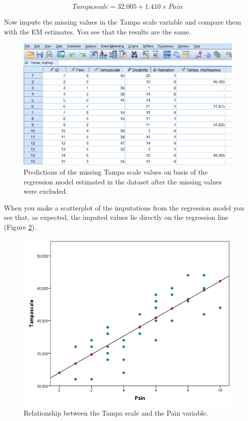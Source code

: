 \documentclass[]{book}
\theoremstyle{definition}
\theoremstyle{definition}
\theoremstyle{definition}
\theoremstyle{remark}
\begin{document}
\[Tampascale = 32.005 + 1.410 × Pain\]

Now impute the missing values in the Tampa scale variable and compare
them with the EM estimates. You see that the results are the same.

\begin{figure}

{\centering \includegraphics[width=0.7\linewidth]{images/fig3.15} 

}

\caption{Predictions of the missing Tampa scale values on basis of the regression model estimated in the dataset after the missing values were excluded.}\label{fig:fig3-15}
\end{figure}

When you make a scatterplot of the imputations from the regression model
you see that, as expected, the imputed values lie directly on the
regression line (Figure \ref{fig:fig3-16}).

\begin{figure}

{\centering \includegraphics[width=0.7\linewidth]{images/fig3.16} 

}

\caption{Relationship between the Tampa scale and the Pain variable.}\label{fig:fig3-16}
\end{figure}
\end{document}
